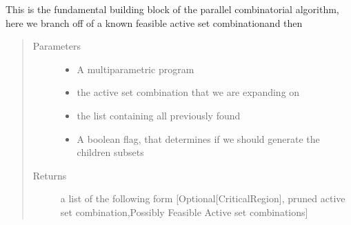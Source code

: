 \documentclass[letterpaper,10pt,english]{sphinxmanual}
\begin{document}
\begin{fulllineitems}
\label{\detokenize{ppopt.mp_solvers:ppopt.mp_solvers.mpqp_parrallel_combinatorial.full_process}}
\sphinxAtStartPar
This is the fundamental building block of the parallel combinatorial algorithm, here we branch off of a known feasible active set combinationand then
\begin{quote}\begin{description}
\item[{Parameters}] \leavevmode\begin{itemize}
\item {} 
\sphinxAtStartPar
{} \textendash{} A multiparametric program

\item {} 
\sphinxAtStartPar
{} \textendash{} the active set combination that we are expanding on

\item {} 
\sphinxAtStartPar
{} \textendash{} the list containing all previously found

\item {} 
\sphinxAtStartPar
{} \textendash{} A boolean flag, that determines if we should generate the children subsets

\end{itemize}

\item[{Returns}] \leavevmode
\sphinxAtStartPar
a list of the following form {[}Optional{[}CriticalRegion{]}, pruned active set combination,Possibly Feasible Active set combinations{]}

\end{description}\end{quote}

\end{fulllineitems}

\end{document}
